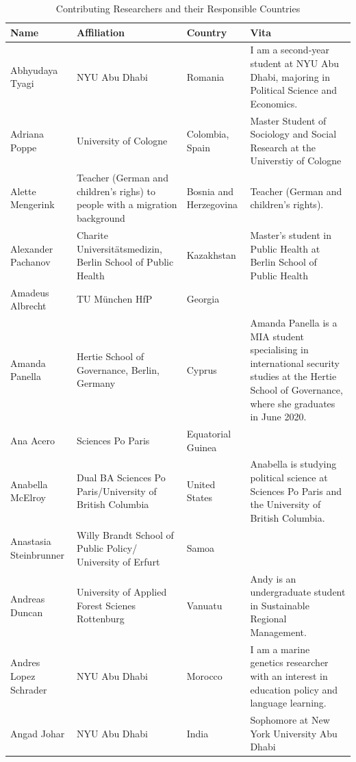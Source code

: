 \documentclass[]{article}
\begin{document}
\begin{longtable}{l>{\raggedright\arraybackslash}p{2cm}>{\raggedright\arraybackslash}p{2cm}>{\raggedright\arraybackslash}p{3cm}}
\caption{\label{tab:ratable}Contributing Researchers and their Responsible Countries}\\
\toprule
Name & Affiliation & Country & Vita\\
\midrule
\rowcolor{gray!6}  Abhyudaya Tyagi & NYU Abu Dhabi & Romania & I am a second-year student at NYU Abu Dhabi, majoring in Political Science and Economics.\\
Adriana Poppe & University of Cologne & Colombia, Spain & Master Student of Sociology and Social Research at the Universtiy of Cologne\\
\rowcolor{gray!6}  Alette Mengerink & Teacher (German and children's righs) to people with a migration background & Bosnia and Herzegovina & Teacher (German and children’s rights).\\
Alexander Pachanov & Charite Universitätsmedizin, Berlin School of Public Health & Kazakhstan & Master's student in Public Health at Berlin School of Public Health\\
\rowcolor{gray!6}  Amadeus Albrecht & TU München HfP & Georgia & \\
\addlinespace
Amanda Panella & Hertie School of Governance, Berlin, Germany & Cyprus & Amanda Panella is a MIA student specialising in international security studies at the Hertie School of Governance, where she graduates in June 2020.\\
\rowcolor{gray!6}  Ana Acero & Sciences Po Paris & Equatorial Guinea & \\
Anabella McElroy & Dual BA Sciences Po Paris/University of British Columbia & United States & Anabella is studying political science at Sciences Po Paris and the University of British Columbia.\\
\rowcolor{gray!6}  Anastasia Steinbrunner & Willy Brandt School of Public Policy/ University of Erfurt & Samoa & \\
Andreas Duncan & University of Applied Forest Scienes Rottenburg & Vanuatu & Andy is an undergraduate student in Sustainable Regional Management.\\
\addlinespace
\rowcolor{gray!6}  Andres Lopez Schrader & NYU Abu Dhabi & Morocco & I am a marine genetics researcher with an interest in education policy and language learning.\\
Angad Johar & NYU Abu Dhabi & India & Sophomore at New York University Abu Dhabi\\

\end{longtable}
\end{document}
